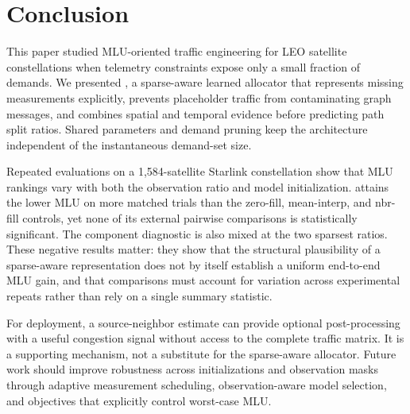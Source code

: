 \section{Conclusion}
\label{sec:conclusion}

This paper studied MLU-oriented traffic engineering for LEO satellite
constellations when telemetry constraints expose only a small fraction of
demands. We presented \sysname{}, a sparse-aware learned allocator that
represents missing measurements explicitly, prevents placeholder traffic
from contaminating graph messages, and combines spatial and temporal
evidence before predicting path split ratios. Shared parameters and demand
pruning keep the architecture independent of the instantaneous demand-set
size.

Repeated evaluations on a 1{,}584-satellite Starlink constellation show
that MLU rankings vary with both the observation ratio and model
initialization.
\sysname{} attains the lower MLU on more matched trials than the zero-fill,
mean-interp, and nbr-fill controls, yet none of its external pairwise
comparisons is statistically significant. The component diagnostic is also
mixed at the two sparsest ratios. These negative results matter: they show
that the structural plausibility of a sparse-aware representation does not
by itself establish a uniform end-to-end MLU gain, and that comparisons
must account for variation across experimental repeats rather than rely on
a single summary statistic.

For deployment, a source-neighbor estimate can provide optional
post-processing with a useful congestion signal without access to the
complete traffic matrix. It is a supporting mechanism, not a substitute for
the sparse-aware allocator. Future work should improve robustness across
initializations and observation masks through adaptive measurement
scheduling, observation-aware model selection, and objectives that
explicitly control worst-case MLU.
